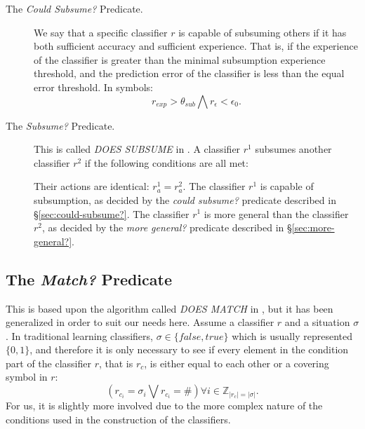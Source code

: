 \begin{description}
\item [The \emph{Could Subsume?} Predicate.]
\label{sec:could-subsume?}
We say that a specific classifier $r$ is capable of subsuming others if it has both sufficient accuracy and sufficient experience.
That is, if the experience of the classifier is greater than the
minimal subsumption experience threshold,
and the prediction error of the classifier is less than the equal error threshold.
In symbols:
\begin{equation}
r_{exp} > \theta_{sub} \bigwedge r_{\epsilon} < \epsilon_0.
\end{equation}

\item [The \emph{Subsume?} Predicate.]
This is called \emph{DOES SUBSUME} in \cite{ButzWilson}.
A classifier $r^1$ subsumes another classifier $r^2$ if the following conditions are all met:
\begin{algorithmic}[1]
\STATE Their actions are identical: $r^1_a = r^2_a$.
\STATE The classifier $r^1$ is capable of subsumption, as decided by the \emph{could subsume?} predicate described in \S\ref{sec:could-subsume?}.
\STATE The classifier $r^1$ is more general than the classifier $r^2$, as decided by the \emph{more general?} predicate described in \S\ref{sec:more-general?}.
\end{algorithmic}

\end{description}

\subsection{The \emph{Match?} Predicate}
\label{sec:match?}
This is based upon the algorithm called \emph{DOES MATCH} in \cite{ButzWilson}, but it has been generalized in order to suit our needs here.
Assume a classifier $r$ and a situation $\sigma$.
In traditional learning classifiers, $\sigma \in \{false, true\}$ which is usually represented $\{0,1\}$,
and therefore it is only necessary to see if every element in the condition part of the classifier $r$,  that is $r_c$, is either equal to each other or a covering symbol in $r$:
\begin{equation}
   \left( r_{c_i} = \sigma_i \bigvee r_{c_i} = \# \right)
      \forall i \in \mathbb{Z}_{|r_c| = |\sigma|}.
\end{equation}
For us, it is slightly more involved due to the more complex nature of the conditions used in the construction of the classifiers.

